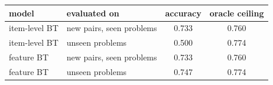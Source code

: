 \begin{tabular}{llcc}
\toprule
model & evaluated on & accuracy & oracle ceiling \\
\midrule
item-level BT & new pairs, seen problems & 0.733 & 0.760 \\
item-level BT & unseen problems & 0.500 & 0.774 \\
feature BT & new pairs, seen problems & 0.733 & 0.760 \\
feature BT & unseen problems & 0.747 & 0.774 \\
\bottomrule
\end{tabular}
